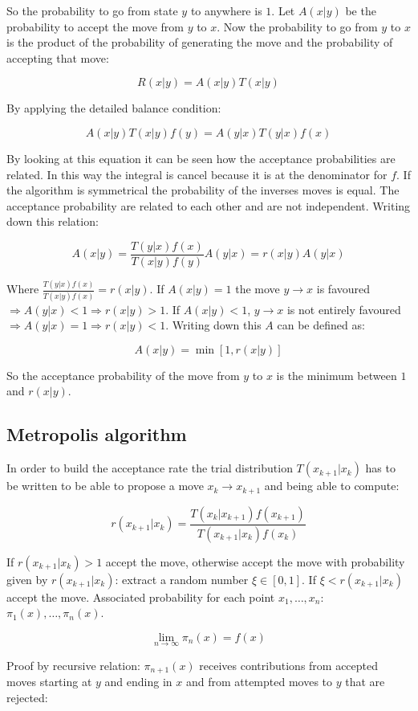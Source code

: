 	So the probability to go from state $y$ to anywhere is $1$.
	Let $A(x|y)$ be the probability to accept the move from $y$ to $x$.
	Now the probability to go from $y$ to $x$ is the product of the probability of generating the move and the probability of accepting that move:

	$$R(x|y) = A(x|y)T(x|y)$$

	By applying the detailed balance condition:

	$$A(x|y)T(x|y)f(y) = A(y|x)T(y|x)f(x)$$

	By looking at this equation it can be seen how the acceptance probabilities are related.
	In this way the integral is cancel because it is at the denominator for $f$.
	If the algorithm is symmetrical the probability of the inverses moves is equal.
	The acceptance probability are related to each other and are not independent.
	Writing down this relation:

	$$A(x|y) = \frac{T(y|x)f(x)}{T(x|y)f(y)}A(y|x) = r(x|y)A(y|x)$$

	Where $\frac{T(y|x)f(x)}{T(x|y)f(x)} = r(x|y)$.
	If $A(x|y) = 1$ the move $y\rightarrow x$ is favoured $\Rightarrow A(y|x)< 1 \Rightarrow r(x|y)>1$.
	If $A(x|y) < 1$, $y\rightarrow x$ is not entirely favoured $\Rightarrow A(y|x) = 1\Rightarrow r(x|y) < 1$.
	Writing down this $A$ can be defined as:

	$$A(x|y) = \min[1, r(x|y)]$$

	So the acceptance probability of the move from $y$ to $x$ is the minimum between $1$ and $r(x|y)$.

	\subsection{Metropolis algorithm}
	In order to build the acceptance rate the trial distribution $T(x_{k+1}|x_k)$ has to be written to be able to propose a move $x_k\rightarrow x_{k+1}$ and being able to compute:

	$$r(x_{k+1}|x_k) = \frac{T(x_k|x_{k+1})f(x_{k+1})}{T(x_{k+1}|x_k)f(x_k)}$$

	If $r(x_{k+1}|x_k)>1$ accept the move, otherwise accept the move with probability given by $r(x_{k+1}|x_k)$: extract a random number $\xi\in[0,1]$.
	If $\xi< r(x_{k+1}|x_k)$ accept the move.
	Associated probability for each point $x_1, \dots, x_n$: $\pi_1(x), \dots, \pi_n(x)$.

	$$\lim\limits_{n\rightarrow\infty}\pi_n(x) = f(x)$$

	Proof by recursive relation: $\pi_{n+1}(x)$ receives contributions from accepted moves starting at $y$ and ending in $x$ and from attempted moves to $y$ that are rejected:

